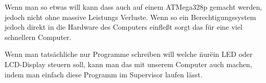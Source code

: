 \documentclass{scrartcl}
\begin{document}
Wenn man so etwas will kann dass auch auf einem ATMega328p gemacht werden, jedoch nicht ohne massive Leistungs Verluste. Wenn so ein Berechtigungssystem jedoch direkt in die Hardware des Computers einfleßt sorgt das für eine viel schnellern Computer. 

Wenn man tatsächliche nur Programme schreiben will welche \"nur\" ein LED oder LCD-Display steuern soll, kann man das mit unserem Computer auch machen, indem man einfach diese Programm im Supervisor laufen lässt.

\printbibliography{}
\end{document}
